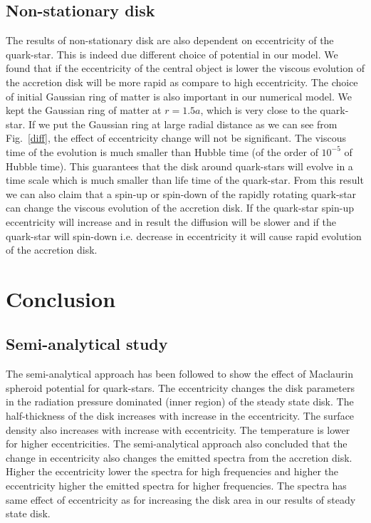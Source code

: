\documentclass[useAMS,usenatbib]{mn2e}
\begin{document}
\subsection{Non-stationary disk}
The results of non-stationary disk are also dependent on eccentricity of the quark-star. This is indeed due different choice of potential in our model. We found that if the eccentricity of the central object is lower the viscous evolution of the accretion disk will be more rapid as compare to high eccentricity. The choice of initial Gaussian ring of matter is also important in our numerical model. We kept the Gaussian ring of matter at $r = 1.5a$, which is very close to the quark-star. If we put the Gaussian ring at large radial distance as we can see from Fig.~\ref{diff}, the effect of eccentricity change will not be significant. The viscous time of the evolution is much smaller than Hubble time (of the order of $10^{-5}$ of Hubble time). This guarantees that the disk around quark-stars will evolve in a time scale which is much smaller than life time of the quark-star. From this result we can also claim that a spin-up or spin-down of the rapidly rotating quark-star can change the viscous evolution of the accretion disk. If the quark-star spin-up eccentricity will increase and in result the diffusion will be slower and if the quark-star will spin-down i.e. decrease in eccentricity it will cause rapid evolution of the accretion disk.
\section{Conclusion}
\subsection{Semi-analytical study}
The semi-analytical approach has been followed to show the effect of Maclaurin spheroid potential for quark-stars. The eccentricity changes the disk parameters in the radiation pressure dominated (inner region) of the steady state disk. The half-thickness of the disk increases with increase in the eccentricity. The surface density also increases with increase with eccentricity. The temperature is lower for higher eccentricities. The semi-analytical approach also concluded that the change in eccentricity also changes the emitted spectra from the accretion disk. Higher the eccentricity lower the spectra for high frequencies and higher the eccentricity higher the emitted spectra for higher frequencies. The spectra has same effect of eccentricity as for increasing the disk area in our results of steady state disk. 
\end{document}
